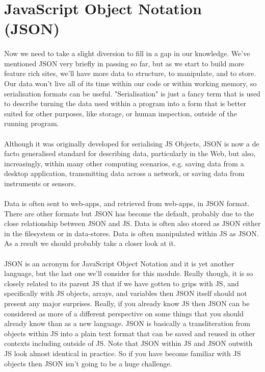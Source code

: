 \section{JavaScript Object Notation (JSON)}
\paragraph{} Now we need to take a slight diversion to fill in a gap in our knowledge. We’ve mentioned JSON very briefly in passing so far, but as we start to build more feature rich sites, we'll have more data to structure, to manipulate, and to store. Our data won't live all of its time within our code or within working memory, so serialisation formats can be useful. "Serialisation" is just a fancy term that is used to describe turning the data used within a program into a form that is better suited for other purposes, like storage, or human inspection, outside of the running program.
\paragraph{} Although it was originally developed for serialising JS Objects, JSON is now a de facto generalised standard for describing data, particularly in the Web, but also, increasingly, within many other computing scenarios, e.g. saving data from a desktop application, transmitting data across a network, or saving data from instruments or sensors.
\paragraph{} Data is often sent to web-apps, and retrieved from web-apps, in JSON format. There are other formats but JSON has become the default, probably due to the close relationship between JSON and JS. Data is often also stored as JSON either in the filesystem or in data-stores. Data is often manipulated within JS as JSON. As a result we should probably take a closer look at it.
\paragraph{} JSON is an acronym for JavaScript Object Notation and it is yet another language, but the last one we'll consider for this module. Really though, it is so closely related to its parent JS that if we have gotten to grips with JS, and specifically with JS objects, arrays, and variables then JSON itself should not present any major surprises. Really, if you already know JS then JSON can be considered as more of a different perspective on some things that you should already know than as a new language. JSON is basically a transliteration from objects within JS into a plain text format that can be saved and reused in other contexts including outside of JS. Note that JSON within JS and JSON outwith JS look almost identical in practice. So if you have become familiar with JS objects then JSON isn’t going to be a huge challenge.

